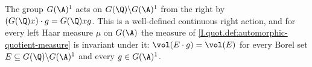 The group $G(\A)^1$ acts on $G(\Q)\backslash G(\A)^1$ from the right by $(G(\Q)x)\cdot g=G(\Q)xg$. This is a well-defined
continuous right action, and for every left Haar measure $\mu$ on $G(\A)$ the measure of
\cref{I.quot.def:automorphic-quotient-measure} is invariant under it: $\vol(E\cdot g)=\vol(E)$ for every Borel set
$E\subseteq G(\Q)\backslash G(\A)^1$ and every $g\in G(\A)^1$.
